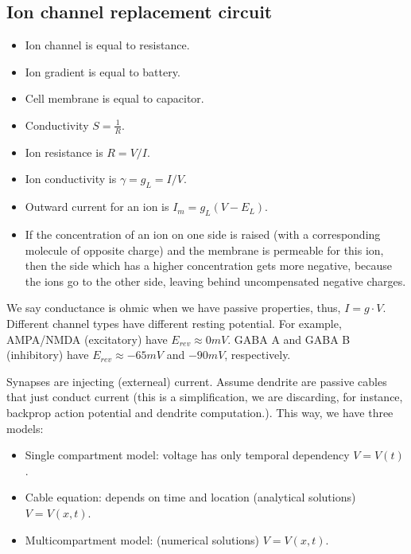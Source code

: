 \documentclass[main]{subfiles}
\begin{document}
\subsection{Ion channel replacement circuit}
\begin{itemize}[noitemsep,nolistsep]
	\item Ion channel is equal to resistance.
	\item Ion gradient is equal to battery.
	\item Cell membrane is equal to capacitor.
	\item Conductivity $S=\frac{1}{R}$.
	\item Ion resistance is $R = V/I$.
	\item Ion conductivity is $\gamma = g_L = I/V$.
	\item Outward current for an ion is $I_m=g_L(V-E_L)$.
	\item If the concentration of an ion on one side is raised (with a corresponding molecule of opposite charge) and the membrane is permeable for this ion, then the side which has a higher concentration gets more negative, because the ions go to the other side, leaving behind uncompensated negative charges.
\end{itemize}
\begin{figure}[H]
	\centering
\end{figure}
\begin{figure}[H]
	\centering
\end{figure}

We say conductance is ohmic when we have passive properties, thus, $I = g \cdot V$.
Different channel types have different resting potential. For example, AMPA/NMDA (excitatory) have $E_{rev} \approx 0 mV$. GABA A and GABA B (inhibitory) have $E_{rev} \approx -65 mV$ and $-90 mV$, respectively.

Synapses are injecting (externeal) current.
Assume dendrite are passive cables that just conduct current (this is a simplification, we are discarding, for instance, backprop action potential and dendrite computation.). This way, we have three models:
\begin{itemize}
\item Single compartment model: voltage has only temporal dependency $V = V(t)$.
\item Cable equation: depends on time and location (analytical solutions) $V = V(x,t)$.
\item Multicompartment model: (numerical solutions) $V = V(x,t)$.
\end{itemize}
\end{document}

